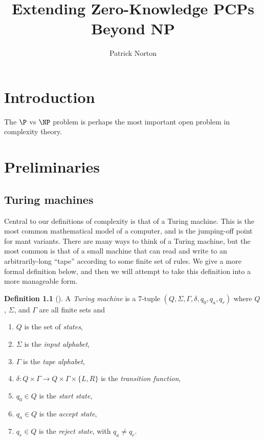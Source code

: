 \documentclass[english,12pt]{reedthesis}
\title{Extending Zero-Knowledge PCPs Beyond NP}
\author{Patrick Norton}
\theoremstyle{plain}
\theoremstyle{definition}
\newtheorem{defn}[defn]{Definition}
\theoremstyle{remark}
\begin{document}
\maketitle

\tableofcontents

\listofalgorithms


\chapter*{Introduction}

The $\P$ vs $\NP$ problem is perhaps the most important open problem in
complexity theory.

\chapter{Preliminaries}


\section{Turing machines}


Central to our definitions of complexity is that of a Turing machine. This is
the most common mathematical model of a computer, and is the jumping-off point
for mant variants. There are many ways to think of a Turing machine, but the
most common is that of a small machine that can read and write to an
arbitrarily-long ``tape'' according to some finite set of rules. We give a more
formal definition below, and then we will attempt to take this definition into a
more manageable form.
\begin{defn}[{\cite[Def.\ 3.1]{Sip97}}]\label{def:TM}
  A \emph{Turing machine} is a 7-tuple $(Q, \Sigma, \Gamma, \delta, q_{0}, q_{a}, q_{r})$ where
  $Q$, $\Sigma$, and $\Gamma$ are all finite sets and
  \begin{enumerate}
    \item $Q$ is the set of \emph{states},
    \item $\Sigma$ is the \emph{input alphabet},
    \item $\Gamma$ is the \emph{tape alphabet},
    \item $\delta: Q \times \Gamma \rightarrow Q \times \Gamma \times \{L, R\}$ is the \emph{transition function},
    \item $q_{0} \in Q$ is the \emph{start state},
    \item $q_{a} \in Q$ is the \emph{accept state},
    \item $q_{r} \in Q$ is the \emph{reject state}, with $q_{a} \ne q_{r}$.
  \end{enumerate}
\end{defn}
\end{document}
